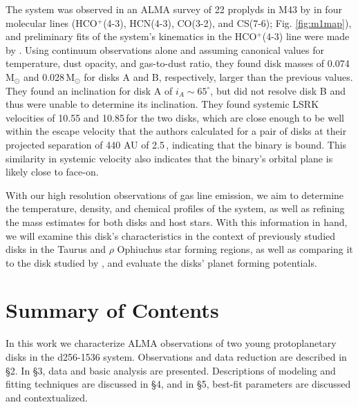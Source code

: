The system was observed in an ALMA survey of 22 proplyds in M43 by \citet{Mann2014} in four molecular lines (HCO$^+$(4-3), HCN(4-3), CO(3-2), and CS(7-6); Fig. \ref{fig:m1map}), and preliminary fits of the system's kinematics in the HCO$^+$(4-3) line were made by \citet{Williams2014}. Using continuum observations alone and assuming canonical values for temperature, dust opacity, and gas-to-dust ratio, they found disk masses of 0.074\,M$_{\odot}$ and 0.028\,M$_{\odot}$ for disks A and B, respectively, larger than the previous values. They found an inclination for disk A of $i_A \sim 65^\circ$, but did not resolve disk B and thus were unable to determine its inclination. They found systemic LSRK velocities of 10.55 and 10.85\,\kms for the two disks, which are close enough to be well within the escape velocity that the authors calculated for a pair of disks at their projected separation of 440 AU of 2.5\,\kms, indicating that the binary is bound. This similarity in systemic velocity also indicates that the binary's orbital plane is likely close to face-on.



With our high resolution observations of gas line emission, we aim to determine the temperature, density, and chemical profiles of the system, as well as refining the mass estimates for both disks and host stars. With this information in hand, we will examine this disk's characteristics in the context of previously studied disks in the Taurus and $\rho$ Ophiuchus star forming regions, as well as comparing it to the disk studied by \citet{Factor2017}, and evaluate the disks' planet forming potentials.






\section{Summary of Contents}

In this work we characterize ALMA observations of two young protoplanetary disks in the d256-1536 system. Observations and data reduction are described in \S2. In \S3, data and basic analysis are presented. Descriptions of modeling and fitting techniques are discussed in \S4, and in \S5, best-fit parameters are discussed and contextualized.




















